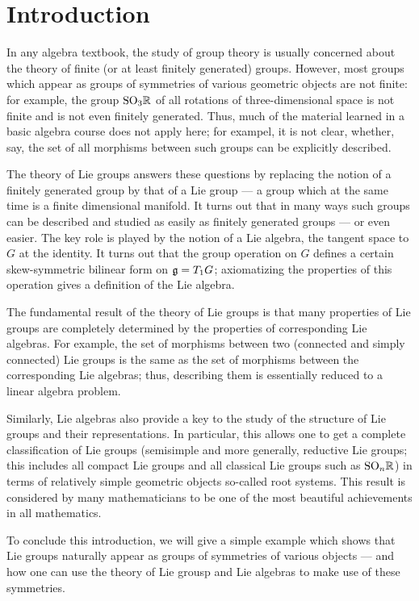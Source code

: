 \chapter{Introduction}
In any algebra textbook, the study of group theory is usually concerned
about the theory of finite (or at least finitely generated)
groups. However, most groups which appear as groups of symmetries of
various geometric objects are not finite: for example, the group
$\mathrm{SO}_3\mathbb{R}$ of all rotations of three-dimensional space is not finite and
is not even finitely generated. Thus, much of the material learned in a
basic algebra course does not apply here; for exampel, it is not clear,
whether, say, the set of all morphisms between such groups can be
explicitly described.

The theory of Lie groups answers these questions by replacing the notion of
a finitely generated group by that of a Lie group --- a group which at the
same time is a finite dimensional manifold. It turns out that in many ways
such groups can be described and studied as easily as finitely generated
groups --- or even easier. The key role is played by the notion of a Lie
algebra, the tangent space to $G$ at the identity. It turns out that the
group operation on $G$ defines a certain skew-symmetric bilinear form on
$\mathfrak{g}= T_1G$; axiomatizing the properties of this operation gives
a definition of the Lie algebra.

The fundamental result of the theory of Lie groups is that many properties
of Lie groups are completely determined by the properties of corresponding
Lie algebras. For example, the set of morphisms between two (connected and
simply connected) Lie groups is the same as the set of morphisms between
the corresponding Lie algebras; thus, describing them is essentially
reduced to a linear algebra problem.

Similarly, Lie algebras also provide a key to the study of the structure of
Lie groups and their representations. In particular, this allows one to get
a complete classification of Lie groups (semisimple and more generally,
reductive Lie groups; this includes all compact Lie groups and all
classical Lie groups such as $\mathrm{SO}_n\mathbb{R}$) in terms of relatively simple
geometric objects so-called root systems. This result is considered by many
mathematicians to be one of the most beautiful achievements in all
mathematics.

To conclude this introduction, we will give  a simple example which shows
that Lie groups naturally appear as groups of symmetries of various
objects --- and how one can use the theory of Lie grousp and Lie algebras
to make use of these symmetries.


